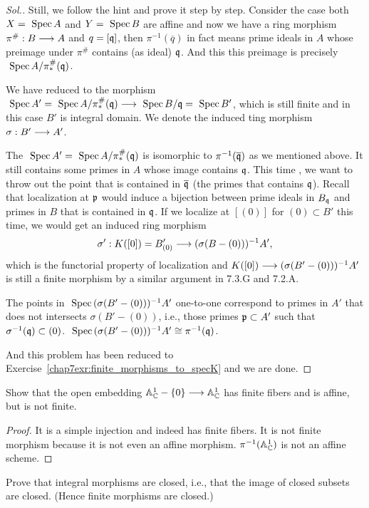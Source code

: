 \documentclass[11pt]{book} %
\begin{document}
\begin{proof}[Sol.]
Still, we follow the hint and prove it step by step. Consider the case both $X=\text{ Spec\,} A$ and $Y=\text{ Spec\,} B$ are affine and now we have a ring morphism $\pi^\#:B\longrightarrow A$ and $q=[\mathfrak q]$, then $\pi^{-1}(\overline{q})$ in fact means prime ideals in $A$ whose preimage under $\pi^\#$ contains (as ideal) $\mathfrak q$. And this this preimage is precisely $\text{ Spec\,} A/\pi^\#_*(\mathfrak q)$.

We have reduced to the morphism $\text{ Spec\,} A'=\text{ Spec\,} A/\pi^\#_*(\mathfrak q)\longrightarrow \text{ Spec\,} B/\mathfrak q=\text{ Spec\,} B'$, which is still finite and in this case $B'$ is integral domain. We denote the induced ting morphism $\sigma:B'\longrightarrow A'$.

The $\text{ Spec\,} A'=\text{ Spec\,} A/\pi^\#_*(\mathfrak q)$ is isomorphic to $\pi^{-1}(\overline{\mathfrak q})$ as we mentioned above. It still contains some primes in $A$ whose image contains $\mathfrak q$. This time , we want to throw out the point that is contained in $\overline{\mathfrak q}$ (the primes that contains $\mathfrak q$). Recall that localization at ${\mathfrak p}$ would induce a bijection between prime ideals in $B_\mathfrak q$ and primes in $B$ that is contained in $\mathfrak q$. If we localize at $[(0)]$ for $(0)\subset B'$ this time, we would get an induced  ring morphism
$$
\sigma':K([0])=B'_{(0)}\longrightarrow (\sigma(B-(0)))^{-1}A',
$$
which is the functorial property of localization and $K([0])\longrightarrow (\sigma(B'-(0)))^{-1}A'$ is still a finite morphism by a similar argument in 7.3.G and 7.2.A.

The points in $\text{ Spec\,} (\sigma(B'-(0)))^{-1}A'$ one-to-one correspond to primes in $A'$ that does not intersects $\sigma(B'-(0))$, i.e., those primes ${\mathfrak p} \subset A'$ such that $\sigma^{-1}(\mathfrak q)\subset (0)$. $\text{ Spec\,} (\sigma(B'-(0)))^{-1}A'\cong \pi^{-1}(\mathfrak q)$.

And this problem has been reduced to Exercise~\ref{chap7exr:finite_morphisms_to_specK} and we are done.
\end{proof}
\begin{exr}
Show that the open embedding $\mathbb A^1_\mathbb C-\{0\}\longrightarrow \mathbb A^1_\mathbb C$ has finite fibers and is affine, but is not finite.
\end{exr}
\begin{proof}
It is a simple injection and indeed has finite fibers. It is not finite morphism because it is not even an affine morphism.
$\pi^{-1}(\mathbb A^1_\mathbb C)$ is not an affine scheme.
\end{proof}
\begin{exr}
Prove that integral morphisms are closed, i.e., that the image of closed subsets are closed. (Hence finite morphisms are closed.)
\end{exr}
\end{document}
